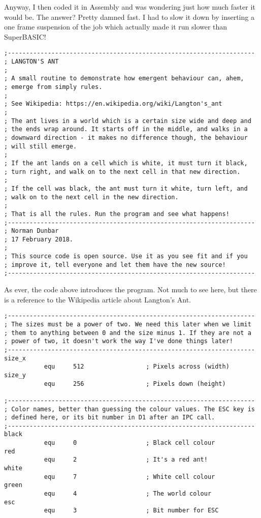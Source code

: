 Anyway, I then coded it in Assembly and was wondering just how much faster it would be. The answer? Pretty damned fast. I had to slow it down by inserting a one frame suspension of the job which actually made it run slower than SuperBASIC!

\begin{lstlisting}[firstnumber=1,caption={Langtons Ant - Opening Blurb}]
;--------------------------------------------------------------------
; LANGTON'S ANT
;
; A small routine to demonstrate how emergent behaviour can, ahem,
; emerge from simply rules.
;
; See Wikipedia: https://en.wikipedia.org/wiki/Langton's_ant
;
; The ant lives in a world which is a certain size wide and deep and
; the ends wrap around. It starts off in the middle, and walks in a
; downward direction - it makes no difference though, the behaviour
; will still emerge.
;
; If the ant lands on a cell which is white, it must turn it black,
; turn right, and walk on to the next cell in that new direction.
;
; If the cell was black, the ant must turn it white, turn left, and
; walk on to the next cell in the new direction.
;
; That is all the rules. Run the program and see what happens!
;--------------------------------------------------------------------
; Norman Dunbar
; 17 February 2018.
;
; This source code is open source. Use it as you see fit and if you
; improve it, tell everyone and let them have the new source!
;--------------------------------------------------------------------
\end{lstlisting}

As ever, the code above introduces the program. Not much to see here, but there is a reference to the Wikipedia article about Langton's Ant.

\begin{lstlisting}[firstnumber=last,caption={Langtons Ant - Equates}]
;--------------------------------------------------------------------
; The sizes must be a power of two. We need this later when we limit
; them to anything between 0 and the size minus 1. If they are not a
; power of two, it doesn't work the way I've done things later!
;--------------------------------------------------------------------
size_x
           equ     512                 ; Pixels across (width)
size_y
           equ     256                 ; Pixels down (height)

;--------------------------------------------------------------------
; Color names, better than guessing the colour values. The ESC key is
; defined here, or its bit number in D1 after an IPC call.
;--------------------------------------------------------------------
black
           equ     0                   ; Black cell colour
red
           equ     2                   ; It's a red ant!
white
           equ     7                   ; White cell colour
green
           equ     4                   ; The world colour
esc
           equ     3                   ; Bit number for ESC
\end{lstlisting}

